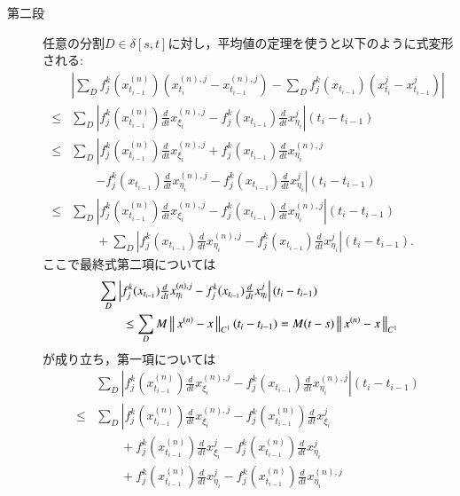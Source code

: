 \begin{prf}
\begin{description}
		\item[第二段]
			任意の分割$D \in \delta[s,t]$に対し，平均値の定理を使うと以下のように式変形される:
			\begin{align}
				&\left| \sum_D f^k_j(x^{(n)}_{t_{i-1}})(x^{(n),j}_{t_i} - x^{(n),j}_{t_{i-1}})
					- \sum_D f^k_j(x_{t_{i-1}})(x^j_{t_i} - x^j_{t_{i-1}}) \right| \\
				\leq &\sum_D \left| f^k_j(x^{(n)}_{t_{i-1}}) \tfrac{d}{dt}x^{(n),j}_{\xi_i} 
					- f^k_j(x_{t_{i-1}}) \tfrac{d}{dt}x^j_{\eta_i} \right|(t_i - t_{i-1}) \\
				\leq &\sum_D \left| f^k_j(x^{(n)}_{t_{i-1}}) \tfrac{d}{dt}x^{(n),j}_{\xi_i} 
					+ f^k_j(x_{t_{i-1}}) \tfrac{d}{dt}x^{(n),j}_{\eta_i} \right.\\
					&\qquad \left.- f^k_j(x_{t_{i-1}}) \tfrac{d}{dt}x^{(n),j}_{\eta_i}
					- f^k_j(x_{t_{i-1}}) \tfrac{d}{dt}x^j_{\eta_i} \right|(t_i - t_{i-1}) \\
				\leq &\sum_D \left| f^k_j(x^{(n)}_{t_{i-1}}) \tfrac{d}{dt}x^{(n),j}_{\xi_i} 
					- f^k_j(x_{t_{i-1}}) \tfrac{d}{dt}x^{(n),j}_{\eta_i} \right|(t_i - t_{i-1}) \\
					&\qquad + \sum_D \left|f^k_j(x_{t_{i-1}}) \tfrac{d}{dt}x^{(n),j}_{\eta_i}
					- f^k_j(x_{t_{i-1}}) \tfrac{d}{dt}x^j_{\eta_i} \right|(t_i - t_{i-1}).
			\end{align}
			ここで最終式第二項については
			\begin{align}
				&\sum_D \left|f^k_j(x_{t_{i-1}}) \tfrac{d}{dt}x^{(n),j}_{\eta_i}
					- f^k_j(x_{t_{i-1}}) \tfrac{d}{dt}x^j_{\eta_i} \right|(t_i - t_{i-1}) \\
				&\qquad \leq \sum_D M \left\|\, x^{(n)} - x\, \right\|_{C^1} (t_i - t_{i-1})
				= M (t - s) \left\|\, x^{(n)} - x\, \right\|_{C^1}
			\end{align}
			が成り立ち，第一項については
			\begin{align}
				&\sum_D \left| f^k_j(x^{(n)}_{t_{i-1}}) \tfrac{d}{dt}x^{(n),j}_{\xi_i} 
					- f^k_j(x_{t_{i-1}}) \tfrac{d}{dt}x^{(n),j}_{\eta_i} \right|(t_i - t_{i-1}) \\
				\leq &\sum_D \left| f^k_j(x^{(n)}_{t_{i-1}}) \tfrac{d}{dt}x^{(n),j}_{\xi_i} 
					- f^k_j(x^{(n)}_{t_{i-1}}) \tfrac{d}{dt}x^{j}_{\xi_i} \right.\\
					&\qquad + f^k_j(x^{(n)}_{t_{i-1}}) \tfrac{d}{dt}x^{j}_{\xi_i}
					- f^k_j(x^{(n)}_{t_{i-1}}) \tfrac{d}{dt}x^{j}_{\eta_i} \\
					&\qquad + f^k_j(x^{(n)}_{t_{i-1}}) \tfrac{d}{dt}x^{j}_{\eta_i}
					- f^k_j(x^{(n)}_{t_{i-1}}) \tfrac{d}{dt}x^{(n),j}_{\eta_i} \\

\end{align}
\end{description}
\end{prf}
